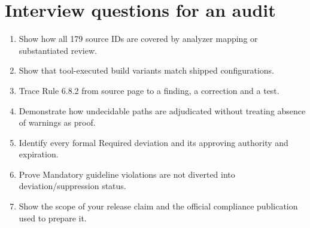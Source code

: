 \documentclass[10pt,letterpaper]{article}
\begin{document}
\section{Interview questions for an audit}
\begin{enumerate}
\item Show how all 179 source IDs are covered by analyzer mapping or substantiated review.
\item Show that tool-executed build variants match shipped configurations.
\item Trace Rule 6.8.2 from source page to a finding, a correction and a test.
\item Demonstrate how undecidable paths are adjudicated without treating absence of warnings as proof.
\item Identify every formal Required deviation and its approving authority and expiration.
\item Prove Mandatory guideline violations are not diverted into deviation/suppression status.
\item Show the scope of your release claim and the official compliance publication used to prepare it.
\end{enumerate}
\end{document}
